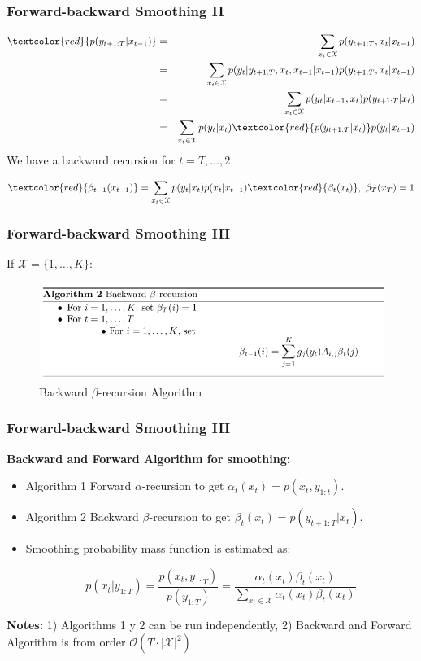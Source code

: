 \documentclass[xcolor=dvipsnames, compress]{beamer}
\begin{document}
\begin{frame}
\frametitle{Forward-backward Smoothing II}
\begin{eqnarray*}
\textcolor{red}{p(y_{t+1:T} |x_{t-1} )} & = & \sum_{x_t \in \mathcal{X}} p(y_{t+1:T},x_t |x_{t-1} )\\
                       & = & \sum_{x_t \in \mathcal{X}} p(y_{t}|y_{t+1:T},x_t,x_{t-1} |x_{t-1} ) p(y_{t+1:T},x_t |x_{t-1} ) \\
     & = & \sum_{x_t \in \mathcal{X}} p(y_{t}|x_{t-1},x_t) p(y_{t+1:T}|x_t)\\
     & = & \sum_{x_t \in \mathcal{X}} p(y_{t}|x_t) \textcolor{red}{p(y_{t+1:T}|x_t)} p(y_{t}|x_{t-1})\\   
\end{eqnarray*}
We have a backward recursion for $t=T, \ldots, 2$

$$ \textcolor{red}{\beta_{t-1}(x_{t-1})} = \sum_{x_t \in \mathcal{X}} p(y_{t}|x_t)  p(x_{t}|x_{t-1}) \textcolor{red}{\beta_t(x_t)}, \mbox{ } \beta_T(x_T)=1 $$

\end{frame}

\begin{frame}
\frametitle{Forward-backward Smoothing III}

If $\mathcal{X}=\{1,\ldots, K\}$:
\begin{figure}
	\includegraphics[scale=0.45]{images/backward_beta_recursion.jpg}
	\caption{Backward $\beta$-recursion Algorithm}
\end{figure}
\end{frame}

\begin{frame}
\frametitle{Forward-backward Smoothing III}
\textbf{Backward and Forward Algorithm for smoothing:}

\begin{itemize}
	\item Algorithm 1 Forward $\alpha$-recursion to get $\alpha_t(x_t)=p(x_t , y_{1:t})$.
	\item Algorithm 2 Backward $\beta$-recursion to get $\beta_t(x_t)=p(y_{t+1:T} |x_t )$.
	\item Smoothing probability mass function is estimated as:
	
	$$ p(x_t | y_{1:T}) = \frac{p(x_t, y_{1:T})}{p(y_{1:T})}=\frac{\alpha_t(x_t) \beta_t(x_t)}{\sum_{x_t \in \mathcal{X}} \alpha_t(x_t) \beta_t(x_t)}$$

\end{itemize}
\vspace{0.5cm}
 \textbf{Notes:} 1) Algorithms 1 y 2 can be run independently, 2) Backward and Forward Algorithm is from order $\mathcal{O}(T\cdot|\mathcal{X}|^2)$

\end{frame}
\end{document}
